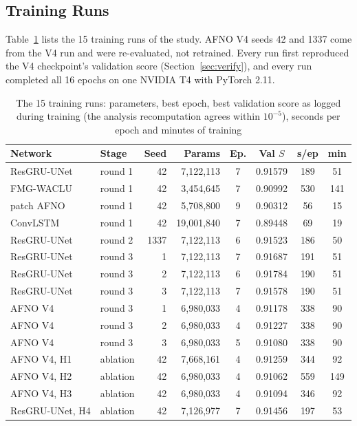 \documentclass[journal]{IEEEtran}
\begin{document}
\subsection{Training Runs}
Table~\ref{tab:runs} lists the 15 training runs of the study. AFNO V4 seeds 42 and 1337 come from the V4 run and were re-evaluated, not retrained. Every run first reproduced the V4 checkpoint's validation score (Section~\ref{sec:verify}), and every run completed all 16 epochs on one NVIDIA T4 with PyTorch 2.11.

\begin{table}[H]
\centering
\caption{The 15 training runs: parameters, best epoch, best validation score as logged during training (the analysis recomputation agrees within $10^{-5}$), seconds per epoch and minutes of training}
\label{tab:runs}
\setlength{\tabcolsep}{2.2pt}
\begin{tabular}{@{}llrrcccc@{}}
\toprule
Network & Stage & Seed & Params & Ep. & Val $S$ & s/ep & min \\
\midrule
ResGRU-UNet & round 1 & 42 & 7{,}122{,}113 & 7 & 0.91579 & 189 & 51 \\
FMG-WACLU & round 1 & 42 & 3{,}454{,}645 & 7 & 0.90992 & 530 & 141 \\
patch AFNO & round 1 & 42 & 5{,}708{,}800 & 9 & 0.90312 & 56 & 15 \\
ConvLSTM & round 1 & 42 & 19{,}001{,}840 & 7 & 0.89448 & 69 & 19 \\
ResGRU-UNet & round 2 & 1337 & 7{,}122{,}113 & 6 & 0.91523 & 186 & 50 \\
ResGRU-UNet & round 3 & 1 & 7{,}122{,}113 & 7 & 0.91687 & 191 & 51 \\
ResGRU-UNet & round 3 & 2 & 7{,}122{,}113 & 6 & 0.91784 & 190 & 51 \\
ResGRU-UNet & round 3 & 3 & 7{,}122{,}113 & 7 & 0.91578 & 190 & 51 \\
AFNO V4 & round 3 & 1 & 6{,}980{,}033 & 4 & 0.91178 & 338 & 90 \\
AFNO V4 & round 3 & 2 & 6{,}980{,}033 & 4 & 0.91227 & 338 & 90 \\
AFNO V4 & round 3 & 3 & 6{,}980{,}033 & 5 & 0.91080 & 338 & 90 \\
AFNO V4, H1 & ablation & 42 & 7{,}668{,}161 & 4 & 0.91259 & 344 & 92 \\
AFNO V4, H2 & ablation & 42 & 6{,}980{,}033 & 4 & 0.91062 & 559 & 149 \\
AFNO V4, H3 & ablation & 42 & 6{,}980{,}033 & 4 & 0.91094 & 346 & 92 \\
ResGRU-UNet, H4 & ablation & 42 & 7{,}126{,}977 & 7 & 0.91456 & 197 & 53 \\
\bottomrule
\end{tabular}
\end{table}
\end{document}
